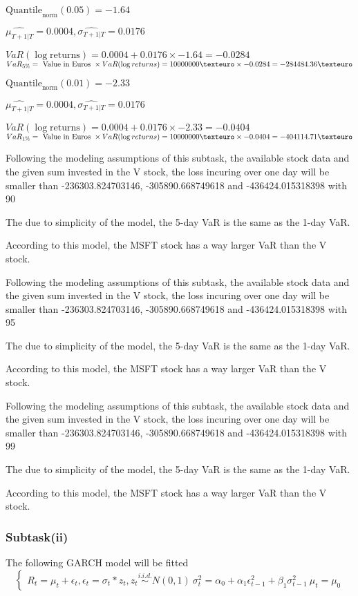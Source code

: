 $\text{Quantile}_\text{norm}(0.05) = -1.64$

$\hat{\mu_{T+1|T}} = 0.0004, \hat{\sigma_{T+1|T}} = 0.0176$

$VaR(\log \text{returns}) = 0.0004 + 0.0176\times-1.64 = -0.0284$
$VaR_{5\%} = \text{ Value in Euros } \times VaR(\log returns) = 10 000 000 \texteuro \times-0.0284 = -284484.36 \texteuro$


$\text{Quantile}_\text{norm}(0.01) = -2.33$

$\hat{\mu_{T+1|T}} = 0.0004, \hat{\sigma_{T+1|T}} = 0.0176$

$VaR(\log \text{returns}) = 0.0004 + 0.0176\times-2.33 = -0.0404$
$VaR_{1\%} = \text{ Value in Euros } \times VaR(\log returns) = 10 000 000 \texteuro \times-0.0404 = -404114.71 \texteuro$


Following the modeling assumptions of this subtask, the available stock data and the given sum invested in the V stock, the loss incuring over one day will be smaller than -236303.824703146, -305890.668749618 and -436424.015318398 with 90%


The due to simplicity of the model, the 5-day VaR is the same as the 1-day VaR.


According to this model, the MSFT stock has a way larger VaR than the V stock.


Following the modeling assumptions of this subtask, the available stock data and the given sum invested in the V stock, the loss incuring over one day will be smaller than -236303.824703146, -305890.668749618 and -436424.015318398 with 95%


The due to simplicity of the model, the 5-day VaR is the same as the 1-day VaR.


According to this model, the MSFT stock has a way larger VaR than the V stock.


Following the modeling assumptions of this subtask, the available stock data and the given sum invested in the V stock, the loss incuring over one day will be smaller than -236303.824703146, -305890.668749618 and -436424.015318398 with 99%


The due to simplicity of the model, the 5-day VaR is the same as the 1-day VaR.


According to this model, the MSFT stock has a way larger VaR than the V stock.

\subsubsection{Subtask(ii)}
 The following GARCH model will be fitted 
$$\begin{cases} R_t = \mu_t + \epsilon_t, \epsilon_t = \sigma_t  * z_t, z_t \overset{i.i.d.}{\sim} N(0,1) \ \sigma^2_t = \alpha_0 + \alpha_1 \epsilon^2_{t-1} + \beta_1 \sigma^2_{t-1} \ \mu_t = \mu_0 \end{cases}$$

